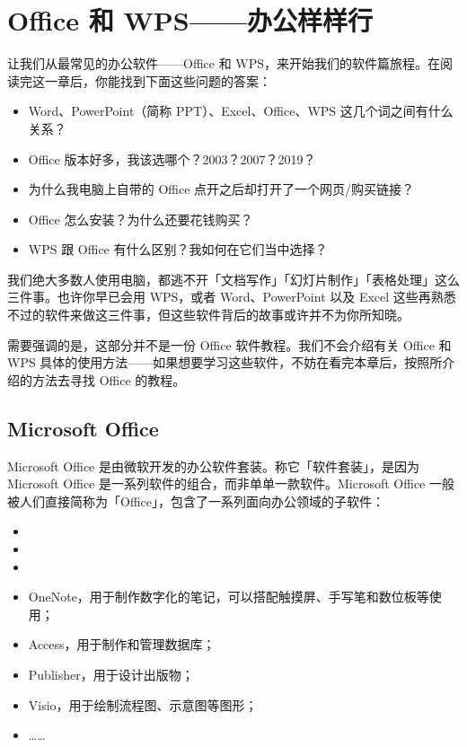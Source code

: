\chapter{Office 和 WPS——办公样样行}
\label{cha:office-and-wps}

\begin{intro}
  让我们从最常见的办公软件——Office 和 WPS，来开始我们的软件篇旅程。在阅读完这一章后，你能找到下面这些问题的答案：
  \begin{itemize}
    \item Word、PowerPoint（简称 PPT）、Excel、Office、WPS 这几个词之间有什么关系？
    \item Office 版本好多，我该选哪个？2003？2007？2019？
    \item 为什么我电脑上自带的 Office 点开之后却打开了一个网页/购买链接？
    \item Office 怎么安装？为什么还要花钱购买？
    \item WPS 跟 Office 有什么区别？我如何在它们当中选择？
  \end{itemize}
\end{intro}

我们绝大多数人使用电脑，都逃不开「文档写作」「幻灯片制作」「表格处理」这么三件事。也许你早已会用 WPS，或者 Word、PowerPoint 以及 Excel 这些再熟悉不过的软件来做这三件事，但这些软件背后的故事或许并不为你所知晓。

需要强调的是，这部分并不是一份 Office 软件教程。我们不会介绍有关 Office 和 WPS 具体的使用方法——如果想要学习这些软件，不妨在看完本章后，按照所介绍的方法去寻找 Office 的教程。

\section{Microsoft Office}

Microsoft Office 是由微软开发的办公软件套装。称它「软件套装」，是因为 Microsoft Office 是一系列软件的组合，而非单单一款软件。Microsoft Office 一般被人们直接简称为「Office」，包含了一系列面向办公领域的子软件：

\begin{itemize}
  \item {}
  \item {}
  \item {}
  \item OneNote，用于制作数字化的笔记，可以搭配触摸屏、手写笔和数位板等使用；
  \item Access，用于制作和管理数据库；
  \item Publisher，用于设计出版物；
  \item Visio，用于绘制流程图、示意图等图形；
  \item ……
\end{itemize}

